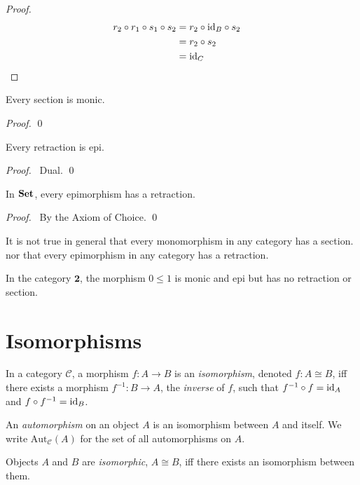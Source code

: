 \begin{proof}
    \pf
    \begin{align*}
        r_2 \circ r_1 \circ s_1 \circ s_2 & = r_2 \circ \mathrm{id}_{B} \circ s_2        \\
                                          & = r_2 \circ s_2                     \\
                                          & = \mathrm{id}_{C}                     & \relax
    \end{align*}
\end{proof}

\begin{prop}
    Every section is monic.
\end{prop}

\begin{proof}
    \pf
    \qed
\end{proof}

\begin{prop}
    Every retraction is epi.
\end{prop}

\begin{proof}
    \pf\ Dual. \qed
\end{proof}

\begin{prop}
    In $\mathbf{Set}$, every epimorphism has a retraction.
\end{prop}

\begin{proof}
    \pf\ By the Axiom of Choice. \qed
\end{proof}

\begin{ex}
    It is not true in general that every monomorphism in any category has a section. nor that every epimorphism in any category has a retraction.

    In the category $\mathbf{2}$, the morphism $0 \leq 1$ is monic and epi but has
    no retraction or section.
\end{ex}


\section{Isomorphisms}

\begin{df}[Isomorphism]
    In a category $\mathcal{C}$, a morphism $f : A \rightarrow B$ is an \emph{isomorphism}, denoted $f : A \cong B$, iff there exists a morphism $f^{-1} : B \rightarrow A$, the \emph{inverse} of $f$, such that $f^{-1} \circ f = \mathrm{id}_{A}$ and $f \circ f^{-1} = \mathrm{id}_{B}$.

    An \emph{automorphism} on an object $A$ is an isomorphism between $A$ and
    itself. We write $\mathrm{Aut}_\mathcal{C}(A)$ for the set of all automorphisms
    on $A$.

    Objects $A$ and $B$ are \emph{isomorphic}, $A \cong B$, iff there exists an
    isomorphism between them.
\end{df}

